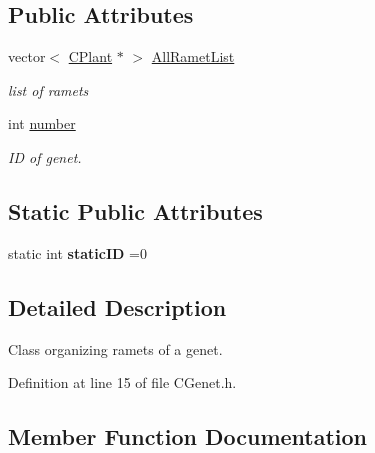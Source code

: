 \subsection*{Public Attributes}
\begin{DoxyCompactItemize}
\item 
\mbox{\label{class_c_genet_aab2770b59f3d35395cf5adf88e7cbef0}} 
vector$<$ \mbox{\hyperlink{class_c_plant}{C\+Plant}} $\ast$ $>$ \mbox{\hyperlink{class_c_genet_aab2770b59f3d35395cf5adf88e7cbef0}{All\+Ramet\+List}}
\begin{DoxyCompactList}\small\item\em list of ramets \end{DoxyCompactList}\item 
\mbox{\label{class_c_genet_a2f04d690fc0ecd0ddf95e11a399c8828}} 
int \mbox{\hyperlink{class_c_genet_a2f04d690fc0ecd0ddf95e11a399c8828}{number}}
\begin{DoxyCompactList}\small\item\em ID of genet. \end{DoxyCompactList}\end{DoxyCompactItemize}
\subsection*{Static Public Attributes}
\begin{DoxyCompactItemize}
\item 
\mbox{\label{class_c_genet_a4c3508a17453c43b88eafe503d1ad41d}} 
static int {\bfseries static\+ID} =0
\end{DoxyCompactItemize}


\subsection{Detailed Description}
Class organizing ramets of a genet. 

Definition at line 15 of file C\+Genet.\+h.



\subsection{Member Function Documentation}
\mbox{\label{class_c_genet_a4cc99b416ede10fdb87dff1c8c820f37}} 
